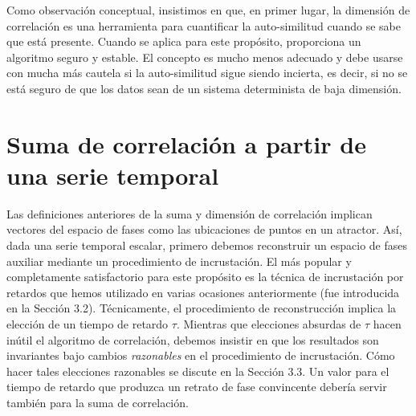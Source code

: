 \documentclass[10pt,a4paper]{book}
\begin{document}
\bigskip

Como observación conceptual, insistimos en que, en primer lugar, la dimensión de correlación es una herramienta para cuantificar la auto-similitud cuando se sabe que está presente. Cuando se aplica para este propósito, proporciona un algoritmo seguro y estable. El concepto es mucho menos adecuado y debe usarse con mucha más cautela si la auto-similitud sigue siendo incierta, es decir, si no se está seguro de que los datos sean de un sistema determinista de baja dimensión.

\newpage

\section{Suma de correlación a partir de una serie temporal}

Las definiciones anteriores de la suma y dimensión de correlación implican vectores del espacio de fases como las ubicaciones de puntos en un atractor. Así, dada una serie temporal escalar, primero debemos reconstruir un espacio de fases auxiliar mediante un procedimiento de incrustación. El más popular y completamente satisfactorio para este propósito es la técnica de incrustación por retardos que hemos utilizado en varias ocasiones anteriormente (fue introducida en la Sección 3.2). Técnicamente, el procedimiento de reconstrucción implica la elección de un tiempo de retardo $\tau$. Mientras que elecciones absurdas de $\tau$ hacen inútil el algoritmo de correlación, debemos insistir en que los resultados son invariantes bajo cambios \textit{razonables} en el procedimiento de incrustación. Cómo hacer tales elecciones razonables se discute en la Sección 3.3. Un valor para el tiempo de retardo que produzca un retrato de fase convincente debería servir también para la suma de correlación.


\bigskip
\end{document}

